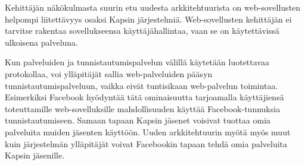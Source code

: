 Kehittäjän näkökulmasta suurin etu uudesta arkkitehtuurista on web-sovellusten helpompi liitettävyys osaksi Kapsin järjestelmiä. Web-sovellusten kehittäjän ei tarvitse rakentaa sovellukseensa käyttäjähallintaa, vaan se on käytettävissä ulkoisena palveluna.

Kun palveluiden ja tunnistautumispalvelun välillä käytetään luotettavaa protokollaa, voi ylläpitäjät sallia web-palveluiden pääsyn tunnistautumispalveluun, vaikka eivät tuntisikaan web-palvelun toimintaa. Esimerkiksi Facebook hyödyntää tätä ominaisuutta tarjoamalla käyttäjiensä toteuttamille web-sovelluksille mahdollisuuden käyttää Facebook-tunnuksia tunnistautumiseen. Samaan tapaan Kapsin jäsenet voisivat tuottaa omia palveluita muiden jäsenten käyttöön. Uuden arkkitehtuurin myötä myös muut kuin järjestelmän ylläpitäjät voivat Facebookin tapaan tehdä omia palveluita Kapsin jäsenille.